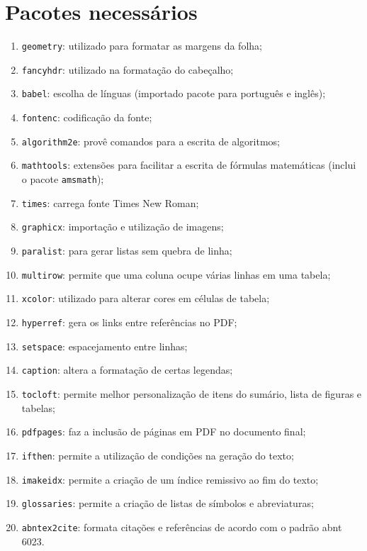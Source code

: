 \documentclass{fei}
\begin{document}
\section{Pacotes necessários}\label{sec:pacotes}
    
    \begin{enumerate}
        \item\texttt{geometry}: utilizado para formatar as margens da folha;
        \item\texttt{fancyhdr}: utilizado na formatação do cabeçalho;
        \item\texttt{babel}: escolha de línguas (importado pacote para português e inglês);
        \item\texttt{fontenc}: codificação da fonte;
        \item\texttt{algorithm2e}: provê comandos para a escrita de algoritmos;
        \item\texttt{mathtools}: extensões para facilitar a escrita de fórmulas matemáticas (inclui o pacote \texttt{amsmath});
        \item\texttt{times}: carrega fonte Times New Roman;
        \item\texttt{graphicx}: importação e utilização de imagens;
        \item\texttt{paralist}: para gerar listas sem quebra de linha;
        \item\texttt{multirow}: permite que uma coluna ocupe várias linhas em uma tabela;
        \item\texttt{xcolor}: utilizado para alterar cores em células de tabela;
        \item\texttt{hyperref}: gera os links entre referências no PDF;
        \item\texttt{setspace}: espacejamento entre linhas;
        \item\texttt{caption}: altera a formatação de certas legendas;
        \item\texttt{tocloft}: permite melhor personalização de itens do sumário, lista de figuras e tabelas;
        \item\texttt{pdfpages}: faz a inclusão de páginas em PDF no documento final;
        \item\texttt{ifthen}: permite a utilização de condições na geração do texto;
        \item\texttt{imakeidx}: permite a criação de um índice remissivo ao fim do texto;
        \item\texttt{glossaries}: permite a criação de listas de símbolos e abreviaturas;
        \item\texttt{abntex2cite}: formata citações e referências de acordo com o padrão \gls{abnt} 6023.
    \end{enumerate}
\end{document}
